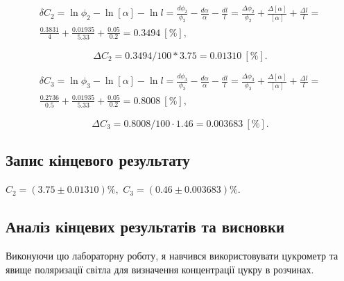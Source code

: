 \documentclass[12pt]{article}
\begin{document}
\begin{center}
\begin{equation}
	\begin{aligned}
		\delta C_2=\ln\phi_2-\ln[\alpha]-\ln l=\frac{d \phi_2}{\phi_2}
		-\frac{d \alpha}{\alpha}
		-\frac{d l}{l}=
		\frac{\Delta\phi_2}{\phi_2}+\frac{\Delta [\alpha]}{[\alpha]}+\frac{\Delta l}{l}=\\
		\frac{0.3831}{4}+\frac{0.01935}{5.33}+\frac{0.05}{0.2}=0.3494~[\%],
	\end{aligned}
\end{equation}

\begin{equation}
	\Delta C_2=0.3494/100*3.75=0.01310~[\%].
\end{equation}

\begin{equation}
	\begin{aligned}
		\delta C_3=\ln\phi_3-\ln[\alpha]-\ln l=\frac{d \phi_3}{\phi_3}
		-\frac{d \alpha}{\alpha}
		-\frac{d l}{l}=
		\frac{\Delta\phi_3}{\phi_3}+\frac{\Delta [\alpha]}{[\alpha]}+\frac{\Delta l}{l}=\\
		\frac{0.2736}{0.5}+\frac{0.01935}{5.33}+\frac{0.05}{0.2}=0.8008~[\%],
	\end{aligned}
\end{equation}

\begin{equation}
	\Delta C_3=0.8008/100\cdot 1.46=0.003683~[\%].
\end{equation}

\subsection*{Запис кінцевого результату}
		$C_2=(3.75\pm0.01310)\%,$
		$C_3=(0.46\pm0.003683)\%.$
\end{center}
\subsection*{Аналіз кінцевих результатів та висновки}
Виконуючи цю лабораторну роботу, я навчився використовувати
цукрометр та явище поляризації світла для визначення
концентрації цукру в розчинах.
\end{document}
